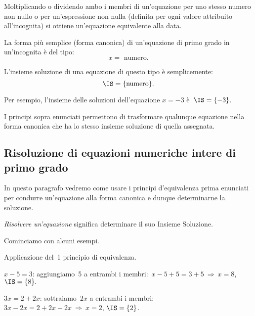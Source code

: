\begin{principio}
 Moltiplicando o dividendo ambo i membri di
un'equazione per uno stesso numero non nullo o per
un'espressione non nulla (definita per ogni valore
attribuito all'incognita) si ottiene
un'equazione equivalente alla data.
\end{principio}


La forma più semplice (forma canonica) di un'equazione di primo grado in
un'incognita è del tipo:
\[x = \text{ numero}.\]

L'insieme soluzione di una
equazione di questo tipo è semplicemente:
\[\IS=\{\text{numero}\}.\]

Per esempio, l'insieme delle soluzioni dell'equazione
$x = -3$ è~$\IS =\{-3\}$.

I principi sopra enunciati permettono di trasformare qualunque equazione
nella forma canonica che ha lo stesso insieme soluzione di quella
assegnata.

\subsection{Risoluzione di equazioni numeriche intere di primo grado}
In questo paragrafo vedremo come usare i principi
d'equivalenza prima enunciati per condurre
un'equazione alla forma canonica e dunque determinarne
la soluzione.

\begin{definizione}
\emph{Risolvere un'equazione} significa
determinare il suo Insieme Soluzione.
\end{definizione}

Cominciamo con alcuni esempi.

\begin{exrig}
 \begin{esempio}
Applicazione del~1{\textdegree} principio di equivalenza.

\begin{enumeratea}
\item $x-5=3$:
aggiungiamo~5 a entrambi i membri:~$x-5+5=3+5\:\Rightarrow\: x=8$, $\IS =\{8\}.$
\item $3x=2+2x$: sottraiamo~$2x$ a entrambi i membri:~$3x-2x=2+2x-2x\:\Rightarrow\: x=2$,
$\IS =\{2\}$.
\end{enumeratea}
 \end{esempio}
\end{exrig}

